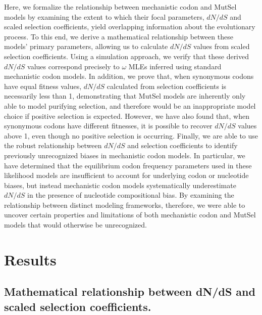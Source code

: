 \documentclass{pnastwo}
\begin{document}
\begin{article}
Here, we formalize the relationship between mechanistic codon and MutSel models by examining the extent to which their focal parameters, $dN/dS$ and scaled selection coefficients, yield overlapping information about the evolutionary process. To this end, we derive a mathematical relationship between these models' primary parameters, allowing us to calculate $dN/dS$ values from scaled selection coefficients. Using a simulation approach, we verify that these derived $dN/dS$ values correspond precisely to $\omega$ MLEs inferred using standard mechanistic codon models. In addition, we prove that, when synonymous codons have equal fitness values, $dN/dS$ calculated from selection coefficients is necessarily less than 1, demonstrating that MutSel models are inherently only able to model purifying selection, and therefore would be an inappropriate model choice if positive selection is expected. However, we have also found that, when synonymous codons have different fitnesses, it is possible to recover $dN/dS$ values above 1, even though no positive selection is occurring. Finally, we are able to use the robust relationship between $dN/dS$ and selection coefficients to identify previously unrecognized biases in mechanistic codon models. In particular, we have determined that the equilibrium codon frequency parameters used in these likelihood models are insufficient to account for underlying codon or nucleotide biases, but instead mechanistic codon models systematically underestimate $dN/dS$ in the presence of nucleotide compositional bias. By examining the relationship between distinct modeling frameworks, therefore, we were able to uncover certain properties and limitations of both mechanistic codon and MutSel models that would otherwise be unrecognized.


\section*{Results}


\subsection*{Mathematical relationship between dN/dS and scaled selection coefficients.}



\end{article}
\end{document}
